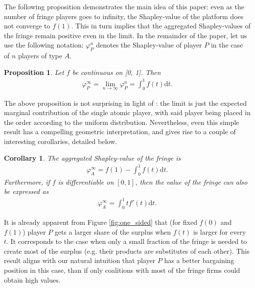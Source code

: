 \documentclass[a4paper]{article}
\newtheorem{proposition}{Proposition}
\newtheorem{corollary}{Corollary}
\newcommand{\dt}{\mathrm{d}t}
\begin{document}
The following proposition demonstrates the main idea of this paper: even as the number of fringe players goes to infinity, the Shapley-value of the platform does not converge to $f(1)$.
This in turn implies that the aggregated Shapley-values of the fringe remain positive even in the limit.
In the remainder of the paper, let us use the following notation: $\varphi_P^n$ denotes the Shapley-value of player $P$ in the case of $n$ players of type $A$.
\begin{proposition}
    \label{prop:one_sided}
    Let $f$ be continuous on [0, 1]. Then
    \begin{align*}
        \varphi_P^\infty = \lim_{n \to \infty} \varphi_P^n = \int_0^1 f(t) \dt .
    \end{align*}
\end{proposition}

The above proposition is not surprising in light of \textcite{fogelman1980asymptotic}: the limit is just the expected marginal contribution of the single atomic player, with said player being placed in the order according to the uniform distribution.
Nevertheless, even this simple result has a compelling geometric interpretation, and gives rise to a couple of interesting corollaries, detailed below.

\begin{corollary}
    \label{cor:fringe_value}
    The aggregated Shapley-value of the fringe is
    \begin{align*}
        \varphi_A^\infty = f(1) - \int_0^1 f(t) \dt.
    \end{align*}
    Furthermore, if $f$ is differentiable on $[0, 1]$, then the value of the fringe can also be expressed as
    \begin{align*}
        \varphi_A^\infty = \int_0^1 t f'(t) \dt.
    \end{align*}
\end{corollary}

It is already apparent from Figure \ref{fig:one_sided} that (for fixed $f(0)$ and $f(1)$) player $P$ gets a larger share of the surplus when $f(t)$ is larger for every $t$.
It corresponds to the case when only a small fraction of the fringe is needed to create most of the surplus (e.g. their products are substitutes of each other).
This result aligns with our natural intuition that player $P$ has a better bargaining position in this case, than if only coalitions with most of the fringe firms could obtain high values.
\end{document}
